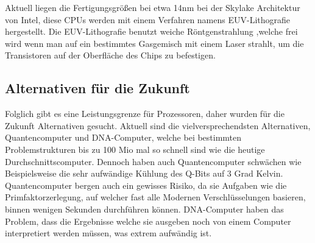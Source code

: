 Aktuell liegen die Fertigungsgrößen bei etwa 14nm bei der Skylake Architektur von Intel, diese CPUs werden mit einem Verfahren namens EUV-Lithografie hergestellt. Die EUV-Lithografie benutzt weiche Röntgenstrahlung ,welche frei wird wenn man auf ein bestimmtes Gasgemisch mit einem Laser strahlt, um die Transistoren auf der Oberfläche des Chips zu befestigen.


\subsection{Alternativen für die Zukunft}

Folglich gibt es eine Leistungsgrenze für Prozessoren, daher wurden für die Zukunft Alternativen gesucht.
Aktuell sind die vielversprechendsten Alternativen, Quantencomputer und DNA-Computer, welche bei bestimmten Problemstrukturen bis zu 100 Mio mal so schnell sind wie die heutige Durchschnittscomputer.
Dennoch haben auch Quantencomputer schwächen wie Beispielsweise die sehr aufwändige Kühlung des Q-Bits auf 3 Grad Kelvin.
Quantencomputer bergen auch ein gewisses Risiko, da sie Aufgaben wie die Primfaktorzerlegung, auf welcher fast alle Modernen Verschlüsselungen basieren, binnen wenigen Sekunden durchführen können.
DNA-Computer haben das Problem, dass die Ergebnisse welche sie ausgeben noch von einem Computer interpretiert werden müssen, was extrem aufwändig ist.

